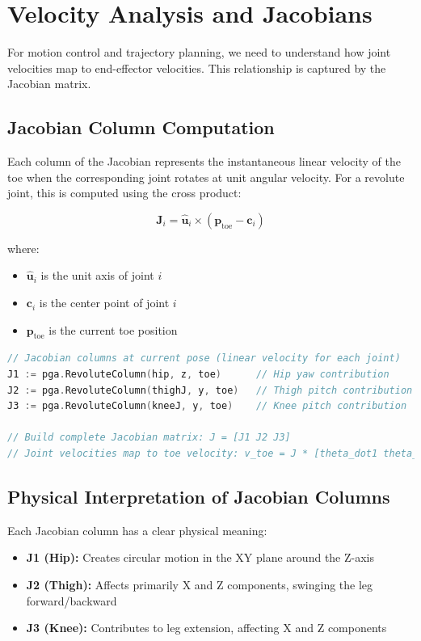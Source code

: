 \documentclass[11pt]{article}
\begin{document}
\section{Velocity Analysis and Jacobians}

For motion control and trajectory planning, we need to understand how joint velocities map to end-effector velocities. This relationship is captured by the Jacobian matrix.

\subsection{Jacobian Column Computation}

Each column of the Jacobian represents the instantaneous linear velocity of the toe when the corresponding joint rotates at unit angular velocity. For a revolute joint, this is computed using the cross product:

\[\mathbf{J}_i = \hat{\mathbf{u}}_i \times (\mathbf{p}_{\text{toe}} - \mathbf{c}_i)\]

where:
\begin{itemize}
    \item $\hat{\mathbf{u}}_i$ is the unit axis of joint $i$
    \item $\mathbf{c}_i$ is the center point of joint $i$  
    \item $\mathbf{p}_{\text{toe}}$ is the current toe position
\end{itemize}

\begin{lstlisting}[language=Go, caption=Jacobian computation for velocity analysis]
// Jacobian columns at current pose (linear velocity for each joint)
J1 := pga.RevoluteColumn(hip, z, toe)      // Hip yaw contribution
J2 := pga.RevoluteColumn(thighJ, y, toe)   // Thigh pitch contribution  
J3 := pga.RevoluteColumn(kneeJ, y, toe)    // Knee pitch contribution

// Build complete Jacobian matrix: J = [J1 J2 J3]
// Joint velocities map to toe velocity: v_toe = J * [theta_dot1 theta_dot2 theta_dot3]^T
\end{lstlisting}

\subsection{Physical Interpretation of Jacobian Columns}

Each Jacobian column has a clear physical meaning:

\begin{itemize}
    \item \textbf{J1 (Hip):} Creates circular motion in the XY plane around the Z-axis
    \item \textbf{J2 (Thigh):} Affects primarily X and Z components, swinging the leg forward/backward
    \item \textbf{J3 (Knee):} Contributes to leg extension, affecting X and Z components
\end{itemize}
\end{document}

